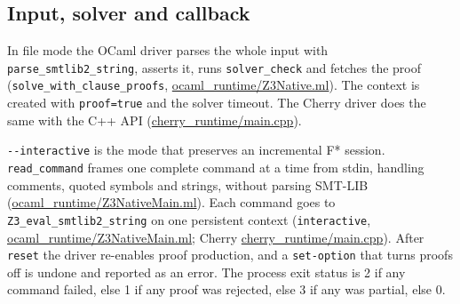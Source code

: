 \documentclass[10pt,a4paper]{article}
\begin{document}
\subsection{Input, solver and callback}\label{sec:31-input-solver-and-callback}

In file mode the OCaml driver parses the whole input with \texttt{parse\_\allowbreak{}smtlib2\_\allowbreak{}string}, asserts it, runs \texttt{solver\_\allowbreak{}check} and fetches the proof (\texttt{solve\_\allowbreak{}with\_\allowbreak{}clause\_\allowbreak{}proofs}, \href{https://github.com/Z3Prover/z3/blob/8fbb275aba0472e862e289c7af1331b3bd5d512c/fstar/ocaml_runtime/Z3Native.ml\#L543-L570}{ocaml\_\allowbreak{}runtime/\allowbreak{}Z3Native.\allowbreak{}ml}). The context is created with \texttt{proof=\allowbreak{}true} and the solver timeout. The Cherry driver does the same with the C++ API (\href{https://github.com/Z3Prover/z3/blob/8fbb275aba0472e862e289c7af1331b3bd5d512c/fstar/cherry_runtime/main.cpp\#L601-L647}{cherry\_\allowbreak{}runtime/\allowbreak{}main.\allowbreak{}cpp}).

\texttt{-{}\allowbreak{}-{}\allowbreak{}interactive} is the mode that preserves an incremental F* session. \texttt{read\_\allowbreak{}command} frames one complete command at a time from stdin, handling comments, quoted symbols and strings, without parsing SMT-LIB (\href{https://github.com/Z3Prover/z3/blob/8fbb275aba0472e862e289c7af1331b3bd5d512c/fstar/ocaml_runtime/Z3NativeMain.ml\#L208-L265}{ocaml\_\allowbreak{}runtime/\allowbreak{}Z3Native\allowbreak{}Main.\allowbreak{}ml}). Each command goes to \texttt{Z3\_\allowbreak{}eval\_\allowbreak{}smtlib2\_\allowbreak{}string} on one persistent context (\texttt{interactive}, \href{https://github.com/Z3Prover/z3/blob/8fbb275aba0472e862e289c7af1331b3bd5d512c/fstar/ocaml_runtime/Z3NativeMain.ml\#L267-L321}{ocaml\_\allowbreak{}runtime/\allowbreak{}Z3Native\allowbreak{}Main.\allowbreak{}ml}; Cherry \href{https://github.com/Z3Prover/z3/blob/8fbb275aba0472e862e289c7af1331b3bd5d512c/fstar/cherry_runtime/main.cpp\#L363-L542}{cherry\_\allowbreak{}runtime/\allowbreak{}main.\allowbreak{}cpp}). After \texttt{reset} the driver re-enables proof production, and a \texttt{set-{}\allowbreak{}option} that turns proofs off is undone and reported as an error. The process exit status is 2 if any command failed, else 1 if any proof was rejected, else 3 if any was partial, else 0.
\end{document}
